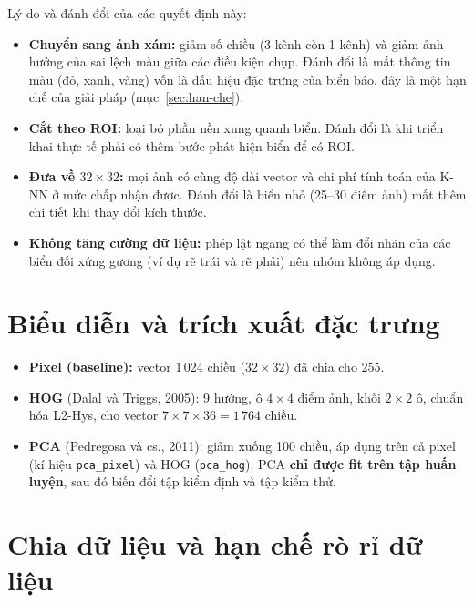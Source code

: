 Lý do và đánh đổi của các quyết định này:

\begin{itemize}
    \item \textbf{Chuyển sang ảnh xám:} giảm số chiều (3 kênh còn 1 kênh) và giảm ảnh hưởng của sai lệch màu giữa các điều kiện chụp. Đánh đổi là mất thông tin màu (đỏ, xanh, vàng) vốn là dấu hiệu đặc trưng của biển báo, đây là một hạn chế của giải pháp (mục~\ref{sec:han-che}).
    \item \textbf{Cắt theo ROI:} loại bỏ phần nền xung quanh biển. Đánh đổi là khi triển khai thực tế phải có thêm bước phát hiện biển để có ROI.
    \item \textbf{Đưa về $32\times32$:} mọi ảnh có cùng độ dài vector và chi phí tính toán của K-NN ở mức chấp nhận được. Đánh đổi là biển nhỏ (25--30 điểm ảnh) mất thêm chi tiết khi thay đổi kích thước.
    \item \textbf{Không tăng cường dữ liệu:} phép lật ngang có thể làm đổi nhãn của các biển đối xứng gương (ví dụ rẽ trái và rẽ phải) nên nhóm không áp dụng.
\end{itemize}

\section{Biểu diễn và trích xuất đặc trưng}

\begin{itemize}
    \item \textbf{Pixel (baseline):} vector 1\,024 chiều ($32\times32$) đã chia cho 255.
    \item \textbf{HOG} (Dalal và Triggs, 2005): 9 hướng, ô $4\times4$ điểm ảnh, khối $2\times2$ ô, chuẩn hóa L2-Hys, cho vector $7\times7\times36=1\,764$ chiều.
    \item \textbf{PCA} (Pedregosa và cs., 2011): giảm xuống 100 chiều, áp dụng trên cả pixel (kí hiệu \texttt{pca\_pixel}) và HOG (\texttt{pca\_hog}). PCA \textbf{chỉ được fit trên tập huấn luyện}, sau đó biến đổi tập kiểm định và tập kiểm thử.
\end{itemize}

\section{Chia dữ liệu và hạn chế rò rỉ dữ liệu}
\label{sec:chia-du-lieu}

